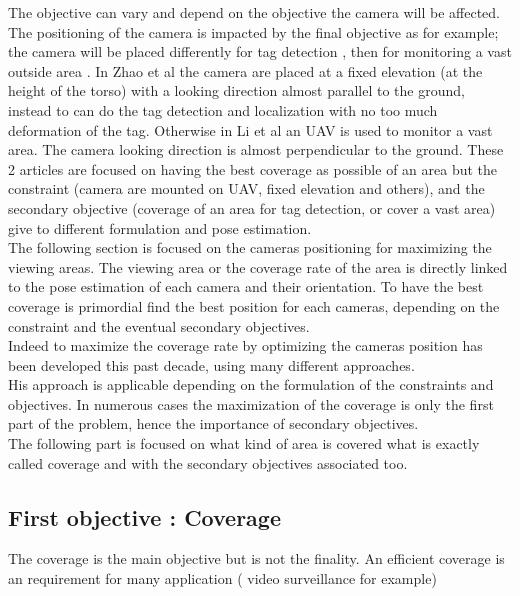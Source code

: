 The objective can vary and depend on the objective the camera will be affected.
The positioning of the camera is impacted by the final objective as for example; the camera will be placed differently for tag detection \cite{22*zhao2008}, then for monitoring a vast outside area \cite{146*li2011}.  In Zhao et al \cite{22*zhao2008} the camera are placed at a fixed elevation (at the height of the torso) with a looking  direction almost parallel to the ground, instead to can do the tag detection and localization with no too much deformation of the tag. Otherwise in Li et al \cite{146*li2011} an UAV is used to monitor a vast area. The camera looking direction is almost perpendicular to the ground. These 2 articles are focused on having the best coverage as possible of an area but the constraint (camera are mounted on UAV, fixed elevation and others), and the secondary objective (coverage of an area for tag detection, or cover a vast area) give to different formulation and pose estimation.
\\
The following section is focused on the cameras positioning for maximizing the viewing areas. The viewing area or the coverage rate of the area is directly linked to the pose estimation of each camera and their orientation. To have the best coverage is primordial find the best position for each cameras, depending on the constraint and the eventual secondary objectives.\\
Indeed to maximize the coverage rate by optimizing the cameras position has been developed this past decade, using many different approaches. \\
His approach is applicable depending on the formulation of the constraints and objectives. In numerous cases the maximization of the coverage is only the first part of the problem, hence the importance of secondary objectives.\\
The following part is focused on what kind of area is covered what is exactly called coverage and with the secondary objectives associated too.

\subsection{First objective : Coverage }

The coverage is the main objective but is not the finality. An efficient coverage is an requirement for many application ( video surveillance  for example) 

